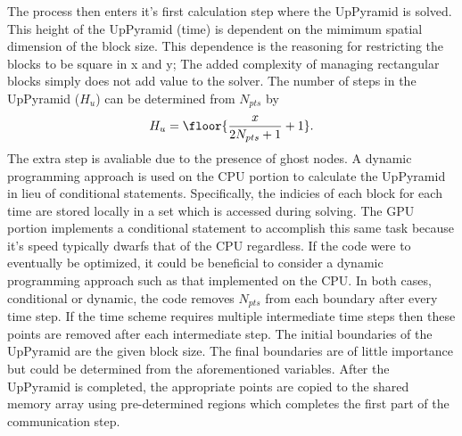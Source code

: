 \documentclass[review]{elsarticle}
\begin{document}
\par
The process then enters it's first calculation step where the UpPyramid is solved. This height of the UpPyramid (time) is dependent on the mimimum spatial dimension of the block size. This dependence is the reasoning for restricting the blocks to be square in x and y; The added complexity of managing rectangular blocks simply does not add value to the solver. The number of steps in the UpPyramid ($H_u$) can be determined from $N_{pts}$ by
\begin{equation}
  H_{u} = \floor{\frac{x}{2N_{pts}+1}+1}.
\end{equation}
The extra step is avaliable due to the presence of ghost nodes. A dynamic programming approach is used on the CPU portion to calculate the UpPyramid in lieu of conditional statements. Specifically, the indicies of each block for each time are stored locally in a set which is accessed during solving. The GPU portion implements a conditional statement to accomplish this same task because it's speed typically dwarfs that of the CPU regardless. If the code were to eventually be optimized, it could be beneficial to consider a dynamic programming approach such as that implemented on the CPU. In both cases, conditional or dynamic, the code removes $N_{pts}$ from each boundary after every time step. If the time scheme requires multiple intermediate time steps then these points are removed after each intermediate step. The initial boundaries of the UpPyramid are the given block size. The final boundaries are of little importance but could be determined from the aforementioned variables.
After the UpPyramid is completed, the appropriate points are copied to the shared memory array using pre-determined regions which completes the first part of the communication step.
\end{document}
